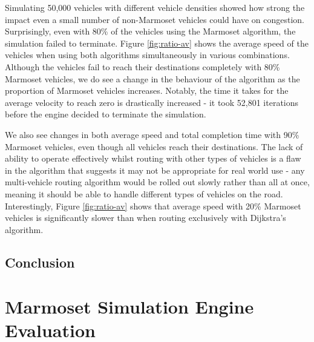 \documentclass[ %
                    author={Alexander Hill},
                supervisor={Dr. Benjamin Sach},
                    degree={MEng},
                     title={MARMOSET},
                  subtitle={Multi-Agent Route Management using Online Simulation for Efficient Transportation},
                      type={research},
                      year={2016} ]{dissertation}
\begin{document}
Simulating 50,000 vehicles with different vehicle densities showed how strong
the impact even a small number of non-Marmoset vehicles could have on
congestion. Surprisingly, even with 80\% of the vehicles using the Marmoset algorithm,
the simulation failed to terminate. Figure \ref{fig:ratio-av} shows the average
speed of the vehicles when using both algorithms simultaneously in various
combinations. Although the vehicles fail to reach their destinations completely with 80\%
Marmoset vehicles, we do see a change in the behaviour of the algorithm as the
proportion of Marmoset vehicles increases. Notably, the time it takes for the
average velocity to reach zero is drastically increased - it took 52,801
iterations before the engine decided to terminate the simulation.

We also see changes in both average speed and total completion time with 90\%
Marmoset vehicles, even though all vehicles reach their destinations. The lack
of ability to operate effectively whilst routing with other types of vehicles
is a flaw in the algorithm that suggests it may not be appropriate for real
world use - any multi-vehicle routing algorithm would be rolled out slowly
rather than all at once, meaning it should be able to handle different types of
vehicles on the road. Interestingly, Figure \ref{fig:ratio-av} shows that average speed with 20\%
Marmoset vehicles is significantly slower than when routing exclusively with
Dijkstra's algorithm.

\subsection{Conclusion}



\section{Marmoset Simulation Engine Evaluation}



\end{document}
